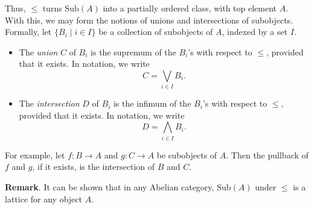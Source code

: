 \documentclass[12pt]{article}
\newcommand{\Sub}{{\mathrm{Sub}}}
\begin{document}
Thus, $\le$ turns $\Sub(A)$ into a partially ordered class, with top element $A$.  With this, we may form the notions of unions and intersections of subobjects.  Formally, let $\lbrace B_i \mid i\in I\rbrace$ be a collection of subobjects of $A$, indexed by a set $I$.  
\begin{itemize}
\item
The \emph{union} $C$ of $B_i$ is the supremum of the $B_i$'s with respect to $\le$, provided that it exists.  In notation, we write $$C=\bigvee_{i\in I} B_i.$$
\item
The \emph{intersection} $D$ of $B_i$ is the infimum of the $B_i$'s with respect to $\le$, provided that it exists.  In notation, we write $$D=\bigwedge_{i\in I} B_i.$$
\end{itemize}

For example, let $f:B \to A$ and $g:C\to A$ be subobjects of $A$.  Then the pullback of $f$ and $g$, if it exists, is the intersection of $B$ and $C$.

\textbf{Remark}.  It can be shown that in any Abelian category, $\Sub(A)$ under $\le$ is a lattice for any object $A$.
\end{document}
